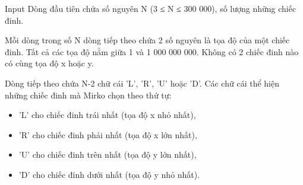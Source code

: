 Input
Dòng đầu tiên chứa số nguyên N (3 ≤ N ≤ 300 000), số lượng những chiếc đinh.  

   Mỗi dòng trong số N dòng tiếp theo chứa 2 số nguyên là tọa độ của một chiếc đinh. Tất cả các tọa độ nằm giữa 1 và 1 000 000 000. Không có 2 chiếc đinh nào có cùng tọa độ x hoặc y.  

   Dòng tiếp theo chứa N-2 chữ cái 'L', 'R', 'U' hoặc 'D'. Các chữ cái thể hiện những chiếc đinh mà Mirko chọn theo thứ tự:  
\begin{itemize}
	\item     'L' cho chiếc đinh trái nhất (tọa độ x nhỏ nhất),   
	\item     'R' cho chiếc đinh phải nhất (tọa độ x lớn nhất),   
	\item     'U' cho chiếc đinh trên nhất (tọa độ y lớn nhất),   
	\item     'D' cho chiếc đinh dưới nhất (tọa độ y nhỏ nhất).   
\end{itemize}